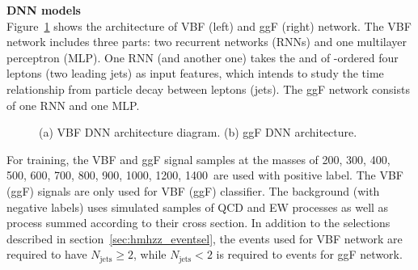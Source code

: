 \textbf{DNN models} \\
Figure~\ref{fig:dnn_arch} shows the architecture of VBF (left) and ggF (right) network.
The VBF network includes three parts: two recurrent networks (RNNs) and one multilayer perceptron (MLP).
One RNN (and another one) takes the \pt and \eta of \pt-ordered four leptons (two leading jets) as input features, which intends to study the time relationship from particle decay between leptons (jets).
The ggF network consists of one RNN and one MLP.

\begin{figure}[htbp]
        \centering
        \caption{(a) VBF DNN architecture diagram. (b) ggF DNN architecture.}
        \label{fig:dnn_arch}
\end{figure}

For training, the VBF and ggF signal samples at the masses of 200, 300, 400, 500, 600, 700, 800, 900, 1000, 1200, 1400~\gev are used with positive label.
The VBF (ggF) signals are only used for VBF (ggF) classifier.
The background (with negative labels) uses simulated samples of QCD and EW \qqZZ processes as well as \ggZZ process summed according to their cross section.
In addition to the selections described in section~\ref{sec:hmhzz_eventsel}, the events used for VBF network are required to have $N_\mathrm{jets} \geq 2$, while $N_\mathrm{jets} < 2$ is required to events for ggF network.

